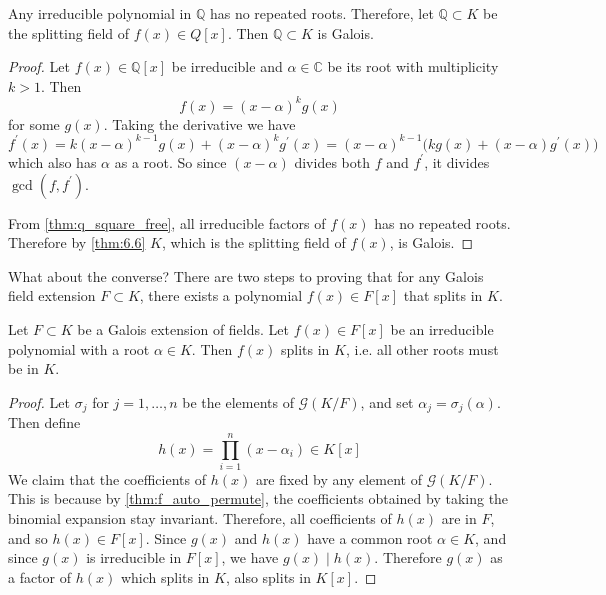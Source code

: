   \begin{theorem}
    \label{thm:q_square_free}
    \label{thm:6.8}
    Any irreducible polynomial in $\mathbb{Q}$ has no repeated roots. Therefore, let $\mathbb{Q} \subset K$ be the splitting field of $f(x) \in Q[x]$. Then $\mathbb{Q} \subset K$ is Galois. 
  \end{theorem} 
  \begin{proof}
    Let $f(x) \in \mathbb{Q}[x]$ be irreducible and $\alpha \in \mathbb{C}$ be its root with multiplicity $k > 1$. Then 
    \begin{equation}
      f(x) = (x - \alpha)^k g(x)
    \end{equation}
    for some $g(x)$. Taking the derivative we have 
    \begin{equation}
      f^\prime(x) = k (x - \alpha)^{k-1} g(x) + (x - \alpha)^k g^\prime (x) = (x - \alpha)^{k-1} \big( k g(x) + (x - \alpha) g^\prime(x) \big)
    \end{equation}
    which also has $\alpha$ as a root. So since $(x - \alpha)$ divides both $f$ and $f^\prime$, it divides $\gcd(f, f^\prime)$. 

    From \ref{thm:q_square_free}, all irreducible factors of $f(x)$ has no repeated roots. Therefore by \ref{thm:6.6} $K$, which is the splitting field of $f(x)$, is Galois. 
  \end{proof}

  What about the converse? There are two steps to proving that for any Galois field extension $F \subset K$, there exists a polynomial $f(x) \in F[x]$ that splits in $K$. 

  \begin{lemma} 
    \label{thm:6.9}
    Let $F \subset K$ be a Galois extension of fields. Let $f(x) \in F[x]$ be an irreducible polynomial with a root $\alpha \in K$. Then $f(x)$ splits in $K$, i.e. all other roots must be in $K$.  
  \end{lemma} 
  \begin{proof}
    Let $\sigma_j$ for $j = 1, \ldots, n$ be the elements of $\mathcal{G}(K/F)$, and set $\alpha_j = \sigma_j (\alpha)$. Then define 
    \begin{equation}
      h(x) = \prod_{i=1}^n (x - \alpha_i)  \in K[x]
    \end{equation}
    We claim that the coefficients of $h(x)$ are fixed by any element of $\mathcal{G}(K/F)$. This is because by \ref{thm:f_auto_permute}, the coefficients obtained by taking the binomial expansion stay invariant. Therefore, all coefficients of $h(x)$ are in $F$, and so $h(x) \in F[x]$. Since $g(x)$ and $h(x)$ have a common root $\alpha \in K$, and since $g(x)$ is irreducible in $F[x]$, we have $g(x) \mid h(x)$. Therefore $g(x)$ as a factor of $h(x)$ which splits in $K$, also splits in $K[x]$. 
  \end{proof}

